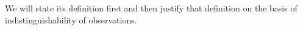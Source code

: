 %
%
We will state its definition first and then justify that definition on the basis of indistinguishability of observations.%
